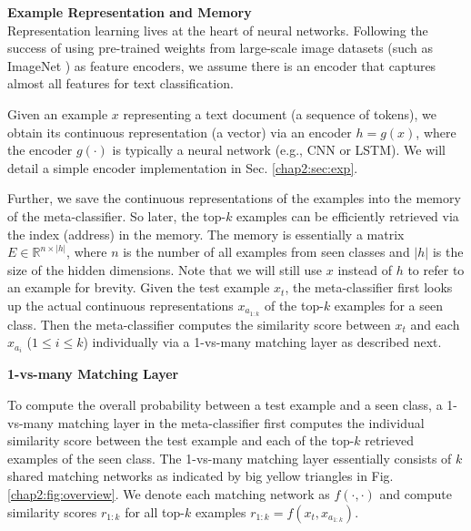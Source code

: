 \textbf{Example Representation and Memory}\\
\label{chap2:sec:mem}
Representation learning lives at the heart of neural networks. 
Following the success of using pre-trained weights from large-scale image datasets (such as ImageNet \cite{russakovsky2015imagenet}) as feature encoders, we assume there is an encoder that captures almost all features for text classification.

Given an example $x$ representing a text document (a sequence of tokens), we obtain its continuous representation (a vector) via an encoder $h=g(x)$, where the encoder $g(\cdot)$ is typically a neural network (e.g., CNN or LSTM).
We will detail a simple encoder implementation in Sec. \ref{chap2:sec:exp}.

Further, we save the continuous representations of the examples into the memory of the meta-classifier.
So later, the top-$k$ examples can be efficiently retrieved via the index (address) in the memory. 
The memory is essentially a matrix $E \in \mathbb{R} ^{n \times |h|}$, where $n$ is the number of all examples from seen classes and $|h|$ is the size of the hidden dimensions.
Note that we will still use $x$ instead of $h$ to refer to an example for brevity.
Given the test example $x_t$, the meta-classifier first looks up the actual continuous representations $x_{a_{1:k} }$ of the top-$k$ examples for a seen class.
Then the meta-classifier computes the similarity score between $x_t$ and each $x_{a_{i} }$ ($1\le i \le k$) individually via a 1-vs-many matching layer as described next. 

\textbf{1-vs-many Matching Layer}
\label{chap2:sec:1vsmany}

To compute the overall probability between a test example and a seen class, a 1-vs-many matching layer in the meta-classifier first computes the individual similarity score between the test example and each of the top-$k$ retrieved examples of the seen class. 
The 1-vs-many matching layer essentially consists of $k$ shared matching networks as indicated by big yellow triangles in Fig. \ref{chap2:fig:overview}.
We denote each matching network as $f(\cdot, \cdot)$ and compute similarity scores $r_{1:k}$ for all top-$k$ examples $r_{1:k}=f(x_t, x_{a_{1:k}} )$.

